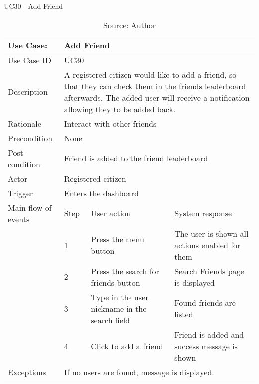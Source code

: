 \begin{table}[ht]
\centering
\caption{UC30 - Add Friend}
\label{uc:30}
\begin{tabular}{|p{3cm}|p{1cm}|p{5cm}|p{5cm}|}
\hline
Use Case:       & \multicolumn{3}{p{11cm}|}{Add Friend} \\ \hline
Use Case ID     & \multicolumn{3}{p{11cm}|}{UC30} \\ \hline
Description     & \multicolumn{3}{p{11cm}|}{A registered citizen would like to add a friend, so that they can check them in the friends leaderboard afterwards. The added user will receive a notification allowing they to be added back.} \\ \hline
Rationale       & \multicolumn{3}{p{11cm}|}{Interact with other friends} \\ \hline
Precondition    & \multicolumn{3}{p{11cm}|}{None} \\ \hline
Post-condition  & \multicolumn{3}{p{11cm}|}{Friend is added to the friend leaderboard} \\ \hline
Actor           & \multicolumn{3}{p{11cm}|}{Registered citizen} \\ \hline
Trigger         & \multicolumn{3}{p{11cm}|}{Enters the dashboard} \\ \hline
Main flow of events & Step  & User action & System response \\ \hline
                    & 1     & Press the menu button & The user is shown all actions enabled for them \\ \hline
                    & 2     & Press the search for friends button & Search Friends page is displayed \\ \hline
                    & 3     & Type in the user nickname in the search field & Found friends are listed \\ \hline
                    & 4     & Click to add a friend & Friend is added and success message is shown \\ \hline
Exceptions      & \multicolumn{3}{p{11cm}|}{If no users are found, message is displayed.} \\ \hline
\end{tabular}
\caption*{Source: Author}
\end{table}


